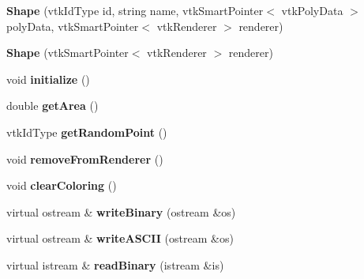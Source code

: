\begin{DoxyCompactItemize}
\item 
\hypertarget{class_shape_aab6c4ff20fa49b8b385b419920d0120b}{}{\bfseries Shape} (vtk\+Id\+Type id, string name, vtk\+Smart\+Pointer$<$ vtk\+Poly\+Data $>$ poly\+Data, vtk\+Smart\+Pointer$<$ vtk\+Renderer $>$ renderer)\label{class_shape_aab6c4ff20fa49b8b385b419920d0120b}

\item 
\hypertarget{class_shape_a33b544996799b9913c84078d72bee332}{}{\bfseries Shape} (vtk\+Smart\+Pointer$<$ vtk\+Renderer $>$ renderer)\label{class_shape_a33b544996799b9913c84078d72bee332}

\item 
\hypertarget{class_shape_a189e5a234a7fb4a8888c6bc7bbb040ff}{}void {\bfseries initialize} ()\label{class_shape_a189e5a234a7fb4a8888c6bc7bbb040ff}

\item 
\hypertarget{class_shape_a24c101a3184c78884e8bf28a90d410c8}{}double {\bfseries get\+Area} ()\label{class_shape_a24c101a3184c78884e8bf28a90d410c8}

\item 
\hypertarget{class_shape_a0818ab153b73b62e9ffe79303c10eb18}{}vtk\+Id\+Type {\bfseries get\+Random\+Point} ()\label{class_shape_a0818ab153b73b62e9ffe79303c10eb18}

\item 
\hypertarget{class_shape_a7f9810d48aa814bd5af8d536cc0d6a30}{}void {\bfseries remove\+From\+Renderer} ()\label{class_shape_a7f9810d48aa814bd5af8d536cc0d6a30}

\item 
\hypertarget{class_shape_a1face9516d3e6bebf44c2014bbdfe19f}{}void {\bfseries clear\+Coloring} ()\label{class_shape_a1face9516d3e6bebf44c2014bbdfe19f}

\item 
\hypertarget{class_shape_a3c8d179a488c3029393333aefdc25257}{}virtual ostream \& {\bfseries write\+Binary} (ostream \&os)\label{class_shape_a3c8d179a488c3029393333aefdc25257}

\item 
\hypertarget{class_shape_a8162aa70114065ac05f82f147eca9e7c}{}virtual ostream \& {\bfseries write\+A\+S\+C\+I\+I} (ostream \&os)\label{class_shape_a8162aa70114065ac05f82f147eca9e7c}

\item 
\hypertarget{class_shape_ad8caa1bf3b5a423887abaa13d92fd70c}{}virtual istream \& {\bfseries read\+Binary} (istream \&is)\label{class_shape_ad8caa1bf3b5a423887abaa13d92fd70c}


\end{DoxyCompactItemize}
